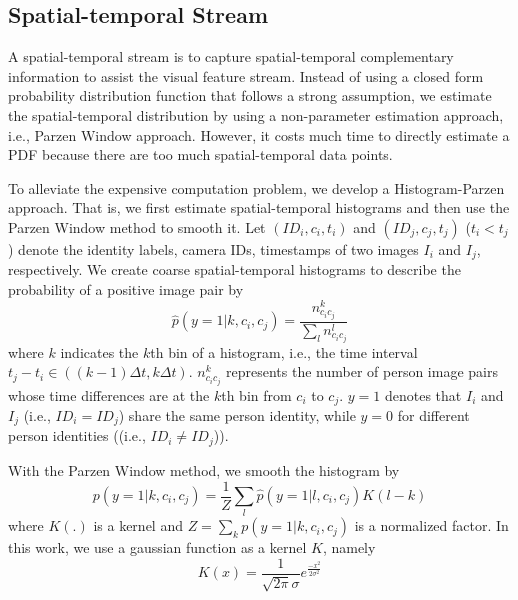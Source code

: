 \documentclass[letterpaper]{article} %
\begin{document}
\subsection{Spatial-temporal Stream}
A spatial-temporal stream is to capture spatial-temporal complementary information to assist the visual feature stream. Instead of using a closed form probability distribution function \cite{huang2016mmm} that follows a strong assumption, we estimate the spatial-temporal distribution by using a non-parameter estimation approach, i.e., Parzen Window approach. However, it costs much time to directly estimate a PDF because there are too much spatial-temporal data points.

To alleviate the expensive computation problem, we develop a Histogram-Parzen approach. That is, we first estimate spatial-temporal histograms and then use the Parzen Window method to smooth it. Let $({ID}_i,c_i,t_i)$ and $({ID}_j,c_j,t_j)$ ($t_i<t_j$) denote the identity labels, camera IDs, timestamps of two images $I_i$ and $I_j$, respectively. We create coarse spatial-temporal histograms to describe the probability of a positive image pair by
\begin{equation}
    \label{eq:hist}
    {\hat p}(y=1|k,c_i,c_j) = \frac{{n_{c_ic_j}^k}}{{\sum\limits_l {n_{c_ic_j}^l} }}
\end{equation}
where $k$ indicates the $k$th bin of a histogram, i.e., the time interval $t_j-t_i\in((k-1)\Delta t,k\Delta t)$. $n_{c_{i}c_{j}}^k$ represents the number of person image pairs whose time differences are at the $k$th bin from $c_i$ to $c_j$. $y=1$ denotes that $I_i$ and $I_j$ (i.e., ${ID}_i={ID}_j$) share the same person identity, while $y=0$ for different person identities ((i.e., ${ID}_i\neq{ID}_j$)).

With the Parzen Window method, we smooth the histogram by
\begin{equation}
    \label{eq:parzen}
    p(y=1|k,c_i,c_j) = \frac{1}{Z}\sum\limits_l {{\hat p}(y=1|l,c_i,c_j)K(l - k)}
\end{equation}
where $K(.)$ is a kernel and $Z = \sum\limits_k {p(y=1|k,c_i,c_j)}$ is a normalized factor. In this work, we use a gaussian function as a kernel $K$, namely
\begin{equation}
    \label{eq:gaussian}
    K(x) = \frac{1}{{\sqrt {2\pi}\sigma }}{e^{\frac{{{-x^2}}}{{2{\sigma ^2}}}}}
\end{equation}
\end{document}

